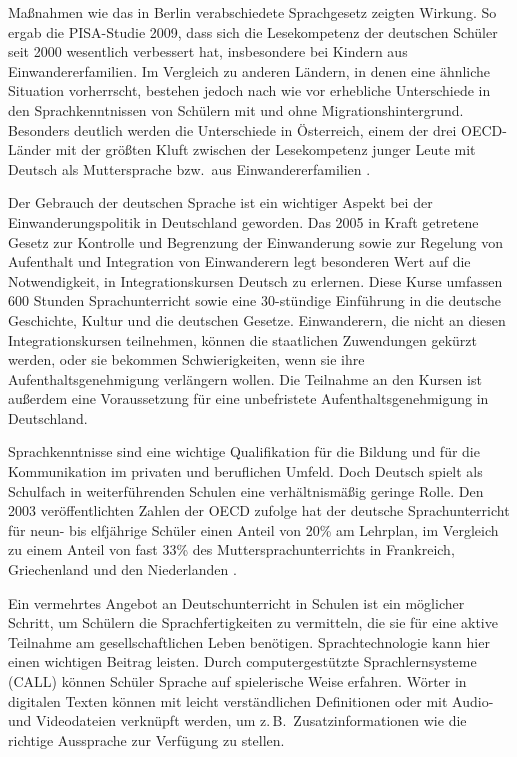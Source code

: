 \documentclass[]{../../metanetpaper}
\begin{document}
\begin{multicols}{2}
Maßnahmen wie das in Berlin verabschiedete Sprachgesetz zeigten Wirkung. So ergab die PISA-Studie 2009, dass sich die Lesekompetenz der deutschen Schüler seit 2000 wesentlich verbessert hat, insbesondere bei Kindern aus Einwandererfamilien. Im Vergleich zu anderen Ländern, in denen eine ähnliche Situation vorherrscht, bestehen jedoch nach wie vor erhebliche Unterschiede in den Sprachkenntnissen von Schülern mit und ohne Migrationshintergrund. Besonders deutlich werden die Unterschiede in Österreich, einem der drei OECD-Länder mit der größten Kluft zwischen der Lesekompetenz junger Leute mit Deutsch als Muttersprache bzw.~aus Einwandererfamilien \cite{Pisa1}.

Der Gebrauch der deutschen Sprache ist ein wichtiger Aspekt bei der Einwanderungspolitik in Deutschland geworden. Das 2005 in Kraft getretene Gesetz zur Kontrolle und Begrenzung der Einwanderung sowie zur Regelung von Aufenthalt und Integration von Einwanderern legt besonderen Wert auf die Notwendigkeit, in Integrationskursen Deutsch zu erlernen. Diese Kurse umfassen 600 Stunden Sprachunterricht sowie eine 30-stün\-dige Einführung in die deutsche Geschichte, Kultur und die deutschen Gesetze. Einwanderern, die nicht an diesen Integrationskursen teilnehmen, können die staatlichen Zuwendungen gekürzt werden, oder sie bekommen Schwierigkeiten, wenn sie ihre Aufenthaltsgenehmigung verlängern wollen. Die Teilnahme an den Kursen ist außerdem eine Voraussetzung für eine unbefristete Aufenthaltsgenehmigung in Deutschland.

Sprachkenntnisse sind eine wichtige Qualifikation für die Bildung und für die Kommunikation im privaten und beruflichen Umfeld. Doch Deutsch spielt als Schulfach in weiterführenden Schulen eine verhältnismäßig geringe Rolle. Den 2003 veröffentlichten Zahlen der OECD zufolge hat der deutsche Sprachunterricht für neun- bis elfjährige Schüler einen Anteil von 20\% am Lehrplan, im Vergleich zu einem Anteil von fast 33\% des Muttersprachunterrichts in Frankreich, Griechenland und den Niederlanden \cite{kmk1}.


Ein vermehrtes Angebot an Deutschunterricht in Schulen ist ein möglicher Schritt, um Schülern die Sprachfertigkeiten zu vermitteln, die sie für eine aktive Teilnahme am gesellschaftlichen Leben benötigen. Sprachtechnologie kann hier einen wichtigen Beitrag leisten. Durch computergestützte Sprachlernsysteme (CALL) können Schüler Sprache auf spielerische Weise erfahren. Wörter in digitalen Texten können mit leicht verständlichen Definitionen oder mit Audio- und Videodateien verknüpft werden, um z.\,B.~Zusatzinformationen wie die richtige Aussprache zur Verfügung zu stellen.


\end{multicols}
\end{document}
